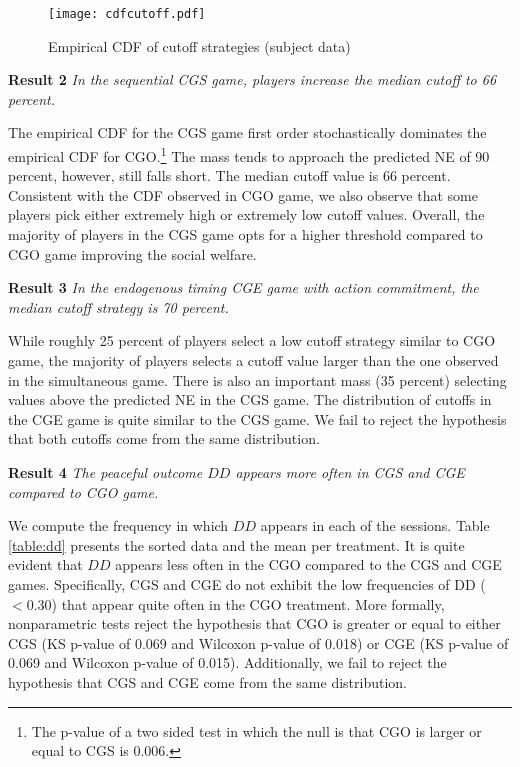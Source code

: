 \documentclass[12pt,english]{article}
\begin{document}
\begin{center}
\begin{figure}[ht]
\centering{}%
\texttt{[image: cdfcutoff.pdf]}%
\caption{Empirical CDF of cutoff strategies (subject data)} 
\label{fig:allcutoff}

\end{figure}
\par\end{center}

\noindent \textbf{Result 2}
\textit{In the sequential CGS game, players increase the median cutoff to 66 percent.}

The empirical CDF for the CGS game first order stochastically dominates the empirical CDF for CGO.\footnote{The p-value of a two sided test in which the null is that CGO is larger or equal to CGS is 0.006.} The mass tends to approach the predicted NE of 90 percent, however, still falls short. The median cutoff value is 66 percent. Consistent with the CDF observed in CGO game, we also observe that some players pick either extremely high or extremely low cutoff values. Overall, the majority of players in the CGS game opts for a higher threshold compared to CGO game improving the social welfare. 

\noindent \textbf{Result 3}
\textit{In the endogenous timing CGE game with action commitment, the median cutoff strategy is 70 percent.}

While roughly 25 percent of players select a low cutoff strategy similar to CGO game, the majority of players selects a cutoff value larger than the one observed in the simultaneous game. There is also an important mass (35 percent) selecting values above the predicted NE in the CGS game. The distribution of cutoffs in the CGE game is quite similar to the CGS game. We fail to reject the hypothesis that both cutoffs come from the same distribution.

\noindent \textbf{Result 4}
\textit{The peaceful outcome $DD$ appears more often in CGS and CGE compared to CGO game.}

We compute the frequency in which $DD$ appears in each of the sessions. Table \ref{table:dd} presents the sorted data and the mean per treatment. It is quite evident that $DD$ appears less often in the CGO compared to the CGS and CGE games. Specifically, CGS and CGE do not exhibit the low frequencies of DD ($<0.30$) that appear quite often in the CGO treatment. More formally, nonparametric tests reject the hypothesis that CGO is greater or equal to either CGS (KS p-value of 0.069 and Wilcoxon p-value of 0.018) or CGE (KS p-value of 0.069 and Wilcoxon p-value of 0.015). Additionally, we fail to reject the hypothesis that CGS and CGE come from the same distribution. 
\end{document}
